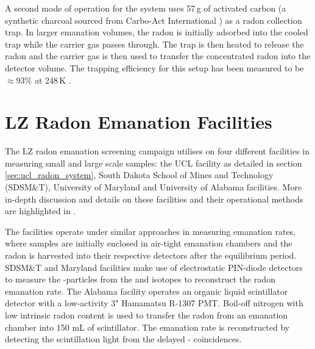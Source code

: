 A second mode of operation for the system uses 57\,g of activated carbon (a synthetic charcoal sourced from Carbo-Act International \cite{Pushkin:2018wdl}) as a radon collection trap. In larger emanation volumes, the radon is initially adsorbed into the cooled trap while the carrier gas passes through. The trap is then heated to release the radon and the carrier gas is then used to transfer the concentrated radon into the detector volume. The trapping efficiency for this setup has been measured to be $\approx 93$\% at 248\,K \cite{xin_2017}.


\section{LZ Radon Emanation Facilities}
\label{sec:otherradon}

The LZ radon emanation screening campaign utilises on four different facilities in measuring small and large scale samples: the UCL facility as detailed in section \ref{sec:ucl_radon_system}, South Dakota School of Mines and Technology (SDSM&T), University of Maryland and University of Alabama facilities. More in-depth discussion and details on these facilities and their operational methods are highlighted in \cite{lz_screening}.

The facilities operate under similar approaches in measuring emanation rates, where samples are initially enclosed in air-tight emanation chambers and the radon is harvested into their respective detectors after the equilibrium period. SDSM\&T and Maryland facilities make use of electrostatic PIN-diode detectors to measure the \alpha-particles from the \PoTOF{} and \PoTOE{} isotopes to reconstruct the radon emanation rate. The Alabama facility operates an organic liquid scintillator detector with a low-activity 3" Hamamatsu R-1307 PMT. Boil-off nitrogen with low intrinsic radon content is used to transfer the radon from an emanation chamber into 150 mL of scintillator. The emanation rate is reconstructed by detecting the scintillation light from the delayed \BiTOF-\PoTOF{} coincidences. 

